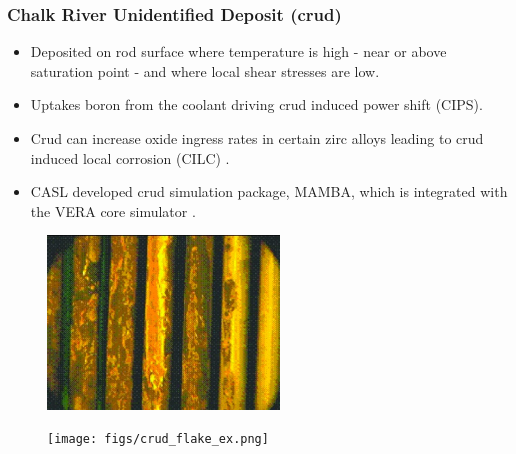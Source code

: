 \documentclass[t, pdftex]{beamer}
\begin{document}
\begin{frame}
\frametitle{Chalk River Unidentified Deposit (crud)}
\vspace{-12pt}
\begin{scriptsize}
    \begin{itemize}
     \item Deposited on rod surface where temperature is high - near or above saturation point - and where local shear stresses are low.
     \item Uptakes boron from the coolant driving
     crud induced power shift (CIPS).

	\item Crud can increase oxide ingress rates in certain zirc alloys leading to crud induced local corrosion (CILC) \cite{kendrick13}.

    \item CASL developed crud simulation package, MAMBA, which is integrated with the VERA core simulator \cite{collins16}.  
    \end{itemize}
\end{scriptsize}

\vspace{-12pt}
    \begin{figure}
        \centering
        \begin{minipage}{.5\textwidth}
            \centering
            \includegraphics[width=0.55\textwidth]{figs/crud-crud.jpg}
        \end{minipage}%
        \begin{minipage}{.5\textwidth}
            \centering
            \texttt{[image: figs/crud\_flake\_ex.png]}
        \end{minipage}
    \end{figure}
\end{frame}
\end{document}
